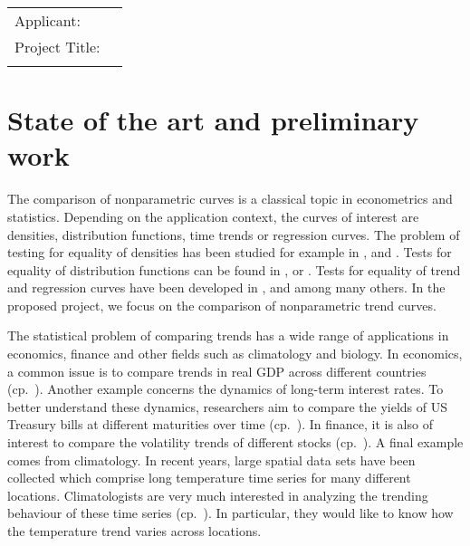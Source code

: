 \documentclass[a4paper,12pt]{article}
\begin{document}
 
\vspace{0.25cm}

\noindent \hrulefill
\vspace{0.5cm}

\noindent\begin{tabular}{ll}
\large{Applicant:} & \noindent {\large Michael Vogt, University of Bonn} \\[0.1cm]
\large{Project Title:} & \noindent {\large New Methods and Theory for the Comparison of} \\
 & \noindent {\large Nonparametric Trend Curves}
\end{tabular}
\vspace{0.5cm}

\noindent \hrulefill

\section{State of the art and preliminary work}\label{sec:stateofart}


The comparison of nonparametric curves is a classical topic in econometrics and statistics. Depending on the application context, the curves of interest are densities, distribution functions, time trends or regression curves. The problem of testing for equality of densities has been studied for example in \cite{Anderson1994},\linebreak \cite{Li1996} and \cite{Mammen2012}. Tests for equality of distribution functions can be found in \cite{Kiefer1959}, \cite{Hogg1962} or \cite{Li2009}. Tests for equality of trend and regression curves have been developed in \cite{Hall1990}, \cite{Delgado1993} and \cite{Young1995} among many others. In the proposed project, we focus on the comparison of nonparametric trend curves.


The statistical problem of comparing trends has a wide range of applications in economics, finance and other fields such as climatology and biology. In economics, a common issue is to compare trends in real GDP across different countries (cp.\ \cite{Grier1989}). %
Another example concerns the dynamics of long-term interest rates. To better understand these dynamics, researchers aim to compare the yields of US Treasury bills at different maturities over time (cp.\ \cite{Park2009}). In finance, it is also of interest to compare the volatility trends of different stocks (cp.\ \cite{Nyblom2000}). A final example comes from climatology. In recent years, large spatial data sets have been collected which comprise long temperature time series for many different locations. Climatologists are very much interested in analyzing the trending behaviour of these time series (cp.\ \cite{Mudelsee2018}). In particular, they would like to know how the temperature trend varies across locations. 
\end{document}
